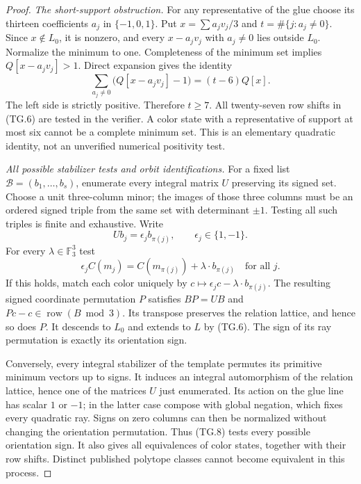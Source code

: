 \documentclass[11pt,a4paper]{article}
\theoremstyle{definition}
\begin{document}
\begin{proof}
\emph{The short-support obstruction.}
For any representative of the glue choose its thirteen coefficients
$a_j$ in $\{-1,0,1\}$. Put
$x=\sum a_jv_j/3$ and $t=\#\{j:a_j\ne0\}$.
Since $x\notin L_0$, it is nonzero, and every $x-a_jv_j$ with
$a_j\ne0$ lies outside $L_0$. Normalize the minimum to one.
Completeness of the minimum set implies $Q[x-a_jv_j]>1$.
Direct expansion gives the identity
\[
 \sum_{a_j\ne0}\bigl(Q[x-a_jv_j]-1\bigr)
       =(t-6)Q[x].                                             \tag{TG.7}
\]
The left side is strictly positive. Therefore $t\ge7$.
All twenty-seven row shifts in (TG.6) are tested in the verifier.
A color state with a representative of support at most six cannot
be a complete minimum set. This is an elementary quadratic identity,
not an unverified numerical positivity test.

\emph{All possible stabilizer tests and orbit identifications.}
For a fixed list $\mathcal B=(b_1,\ldots,b_s)$, enumerate every integral
matrix $U$ preserving its signed set. Choose a unit three-column minor;
the images of those three columns must be an ordered signed triple
from the same set with determinant $\pm1$. Testing all such triples
is finite and exhaustive. Write
\[
 Ub_j=\epsilon_j b_{\pi(j)},\qquad\epsilon_j\in\{1,-1\}.
\]
For every $\lambda\in\mathbb F_3^3$ test
\[
 \epsilon_j C(m_j)
     = C(m_{\pi(j)})+\lambda\mathbin{\cdot}b_{\pi(j)}
       \quad\text{for all }j.                                 \tag{TG.8}
\]
If this holds, match each color uniquely by
$c\mapsto\epsilon_jc-\lambda\cdot b_{\pi(j)}$.
The resulting signed coordinate permutation $P$ satisfies
$BP=UB$ and $Pc-c\in\operatorname{row}(B\bmod3)$.
Its transpose preserves the relation lattice, and hence so does $P$.
It descends to $L_0$ and extends to $L$ by (TG.6).
The sign of its ray permutation is exactly its orientation sign.

Conversely, every integral stabilizer of the template permutes its
primitive minimum vectors up to signs. It induces an integral
automorphism of the relation lattice, hence one of the matrices $U$
just enumerated. Its action on the glue line has scalar $1$ or $-1$;
in the latter case compose with global negation, which fixes every
quadratic ray. Signs on zero columns can then be normalized without
changing the orientation permutation. Thus (TG.8) tests every
possible orientation sign. It also gives all equivalences of color
states, together with their row shifts. Distinct published polytope
classes cannot become equivalent in this process.


\end{proof}
\end{document}
